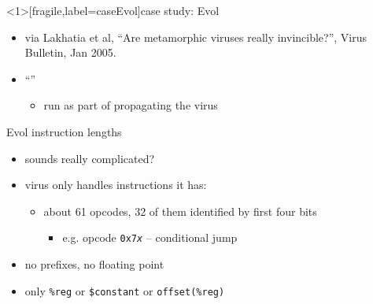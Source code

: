 \usetikzlibrary{arrows.meta,matrix}
\begin{frame}<1>[fragile,label=caseEvol]{case study: Evol}
    \begin{itemize}
    \item via Lakhatia et al, ``Are metamorphic viruses really invincible?'', Virus Bulletin, Jan 2005.
    \item ``''
        \begin{itemize}
        \item run as part of propagating the virus
        \end{itemize}
    \end{itemize}
\end{frame}


\begin{frame}{Evol instruction lengths}
    \begin{itemize}
    \item sounds really complicated?
    \item virus only handles instructions it has:
        \begin{itemize}
        \item about 61 opcodes, 32 of them identified by first four bits
            \begin{itemize}
            \item e.g. opcode {\tt 0x7\textit{x}} -- conditional jump
            \end{itemize}
        \end{itemize}
    \item no prefixes, no floating point
    \item only {\tt \%reg} or {\tt \$constant} or {\tt offset(\%reg)}
    \end{itemize}
\end{frame}

